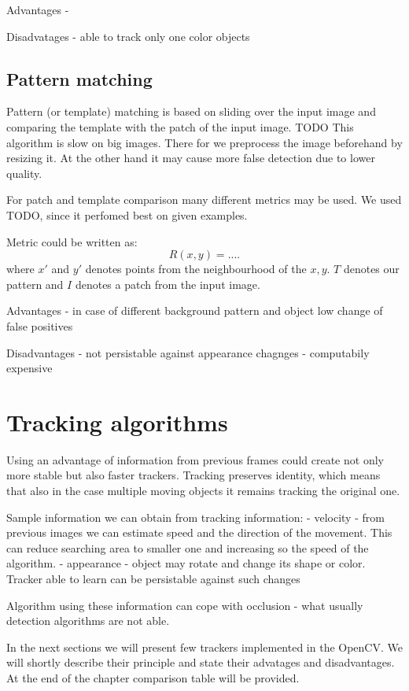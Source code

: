 Advantages
- 

Disadvatages
- able to track only one color objects

\subsection {Pattern matching}

Pattern (or template) matching is based on sliding over the input image and comparing the template with the patch of the input image. TODO This algorithm is slow on big images. There for we preprocess the image beforehand by resizing it. At the other hand it may cause more false detection due to lower quality.

For patch and template comparison many different metrics may be used. We used TODO, since it perfomed best on given examples.

Metric could be written as:
$$R(x, y) = ....$$
where $x'$ and $y'$ denotes points from the neighbourhood of the $x, y$. $T$ denotes our pattern and $I$ denotes a patch from the input image. 

Advantages
- in case of different background pattern and object low change of false positives

Disadvantages
- not persistable against appearance chagnges
- computabily expensive


\section{Tracking algorithms}

Using an advantage of information from previous frames could create not only
more stable but also faster trackers. Tracking preserves identity, which means
that also in the case multiple moving objects it remains tracking the original
one.

Sample information we can obtain from tracking information:
- velocity - from previous images we can estimate speed and the direction of
  the movement. This can reduce searching area to smaller one and increasing so
  the speed of the algorithm.
- appearance - object may rotate and change its shape or color. Tracker able to
  learn can be persistable against such changes

Algorithm using these information can cope with occlusion - what usually
detection algorithms are not able.

In the next sections we will present few trackers implemented in the OpenCV. We
will shortly describe their principle and state their advatages and
disadvantages. At the end of the chapter comparison table will be provided.

